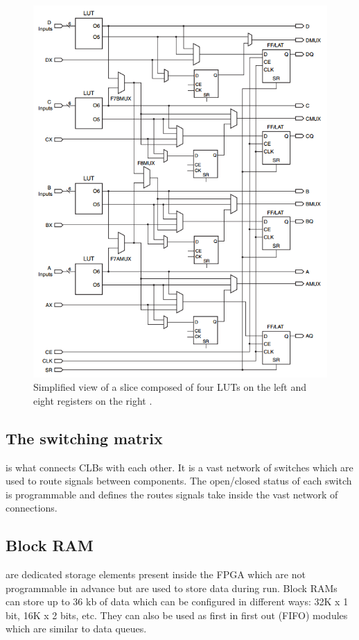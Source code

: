    \begin{figure}[p!]
      \centering
      \includegraphics[width=\textwidth]{img/II-6-irradiation/clb.png}
      \caption{Simplified view of a slice composed of four LUTs on the left and eight registers on the right \cite{VIRTEX-CLB}.}
      \label{fig:II-6-clb}
    \end{figure}

    \subsection{The switching matrix} is what connects CLBs with each other. It is a vast network of switches which are used to route signals between components. The open/closed status of each switch is programmable and defines the routes signals take inside the vast network of connections.

    \subsection{Block RAM} are dedicated storage elements present inside the FPGA which are not programmable in advance but are used to store data during run. Block RAMs can store up to 36 kb of data which can be configured in different ways: 32K x 1 bit, 16K x 2 bits, etc. They can also be used as first in first out (FIFO) modules which are similar to data queues.

